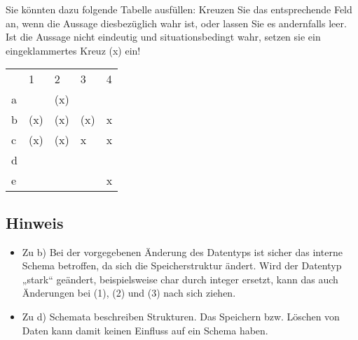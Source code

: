 \documentclass{bschlangaul-aufgabe}
\begin{document}
\noindent
Sie könnten dazu folgende Tabelle ausfüllen: Kreuzen Sie das
entsprechende Feld an, wenn die Aussage diesbezüglich wahr ist, oder
lassen Sie es andernfalls leer. Ist die Aussage nicht eindeutig und
situationsbedingt wahr, setzen sie ein eingeklammertes Kreuz (x) ein!

\begin{bAntwort}
\begin{tabular}{lllll}
  &  1  &  2  & 3   & 4 \\
a &     & (x) &     &   \\
b & (x) & (x) & (x) & x \\
c & (x) & (x) &  x  & x \\
d &     &     &     &   \\
e &     &     &     & x
\end{tabular}

\subsection{Hinweis}

\begin{itemize}
\item Zu b) Bei der vorgegebenen Änderung des Datentyps ist sicher das
interne Schema betroffen, da sich die Speicherstruktur ändert. Wird der
Datentyp „stark“ geändert, \dh beispielsweise char durch integer
ersetzt, kann das auch Änderungen bei (1), (2) und (3) nach sich ziehen.

\item Zu d) Schemata beschreiben Strukturen. Das Speichern bzw. Löschen
von Daten kann damit keinen Einfluss auf ein Schema haben.
\end{itemize}

\end{bAntwort}
\end{document}
